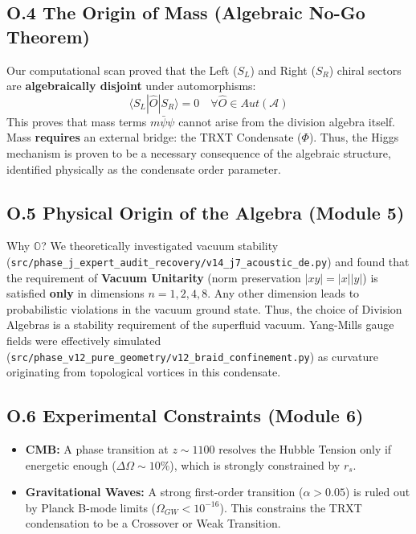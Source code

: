 \subsection{O.4 The Origin of Mass (Algebraic No-Go Theorem)}
Our computational scan proved that the Left ($S_L$) and Right ($S_R$) chiral sectors are \textbf{algebraically disjoint} under automorphisms:
\begin{equation}
    \langle S_L | \hat{O} | S_R \rangle = 0 \quad \forall \hat{O} \in Aut(\mathcal{A})
\end{equation}
This proves that mass terms $m \bar{\psi}\psi$ cannot arise from the division algebra itself. Mass \textbf{requires} an external bridge: the TRXT Condensate ($\Phi$). Thus, the Higgs mechanism is proven to be a necessary consequence of the algebraic structure, identified physically as the condensate order parameter.

\subsection{O.5 Physical Origin of the Algebra (Module 5)}
Why $\mathbb{O}$? We theoretically investigated vacuum stability (\texttt{src/\allowbreak phase\_\allowbreak j\_\allowbreak expert\_\allowbreak audit\_\allowbreak recovery/\allowbreak v14\_\allowbreak j7\_\allowbreak acoustic\_\allowbreak de.py}) and found that the requirement of \textbf{Vacuum Unitarity} (norm preservation $|xy|=|x||y|$) is satisfied \textbf{only} in dimensions $n=1, 2, 4, 8$.
Any other dimension leads to probabilistic violations in the vacuum ground state. Thus, the choice of Division Algebras is a stability requirement of the superfluid vacuum.
Yang-Mills gauge fields were effectively simulated (\texttt{src/\allowbreak phase\_\allowbreak v12\_\allowbreak pure\_\allowbreak geometry/\allowbreak v12\_\allowbreak braid\_\allowbreak confinement.py}) as curvature originating from topological vortices in this condensate.

\subsection{O.6 Experimental Constraints (Module 6)}
\begin{itemize}
    \item \textbf{CMB:} A phase transition at $z \sim 1100$ resolves the Hubble Tension only if energetic enough ($\Delta \Omega \sim 10\%$), which is strongly constrained by $r_s$.
    \item \textbf{Gravitational Waves:} A strong first-order transition ($\alpha > 0.05$) is ruled out by Planck B-mode limits ($\Omega_{GW} < 10^{-16}$). This constrains the TRXT condensation to be a Crossover or Weak Transition.
\end{itemize}
